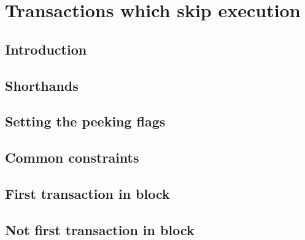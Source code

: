 
\section{Transactions which skip \evm{} execution \lispTodo{}}
\subsection{Introduction}                                        \label{hub: tx skip: intro}                     
\subsection{Shorthands                            \lispTodo{}}   \label{hub: tx skip: shorthands}                
\subsection{Setting the peeking flags             \lispTodo{}}   \label{hub: tx skip: setting peeking flags}     
\subsection{Common constraints                    \lispTodo{}}   \label{hub: tx skip: common}                    
\subsection{First transaction in block            \lispTodo{}}   \label{hub: tx skip: first tx in block}         
\subsection{Not first transaction in block        \lispTodo{}}   \label{hub: tx skip: not first tx in block}     
